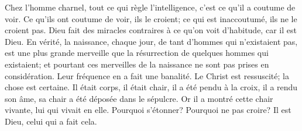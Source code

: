 Chez l’homme charnel, tout ce qui règle l’intelligence,
	c’est ce qu’il a coutume de voir.
Ce qu’ils ont coutume de voir, ils le croient;
	ce qui est inaccoutumé, ils ne le croient pas.
Dieu fait des miracles contraires à ce qu’on voit d’habitude,
	car il est Dieu.
En vérité, la naissance, chaque jour, de tant d’hommes qui n’existaient pas,
	est une plus grande merveille
		que la résurrection de quelques hommes qui existaient;
	et pourtant ces merveilles de la naissance
	ne sont pas prises en considération.
Leur fréquence en a fait une banalité.
Le Christ est ressuscité;
	la chose est certaine.
Il était corps, il était chair, il a été pendu à la croix,
	il a rendu son âme, sa chair a été déposée dans le sépulcre.
	Or il a montré cette chair vivante, lui qui vivait en elle.
Pourquoi s’étonner? Pourquoi ne pas croire?
	Il est Dieu, celui qui a fait cela.
